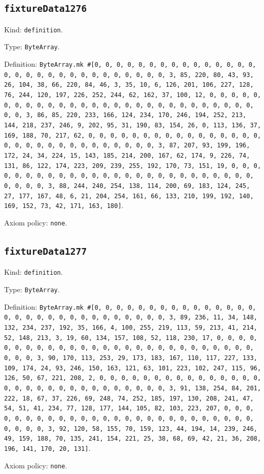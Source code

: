 \documentclass[11pt]{article}
\begin{document}
\subsection*{\texttt{fixtureData1276}}
\noindent Kind: \texttt{definition}.\par
\noindent Type: \texttt{ByteArray}.\par
\noindent Definition: \texttt{ByteArray.mk \#[0, 0, 0, 0, 0, 0, 0, 0, 0, 0, 0, 0, 0, 0, 0, 0, 0, 0, 0, 0, 0, 0, 0, 0, 0, 0, 0, 0, 0, 0, 3, 85, 220, 80, 43, 93, 26, 104, 38, 66, 220, 84, 46, 3, 35, 10, 6, 126, 201, 106, 227, 128, 76, 244, 120, 197, 226, 252, 244, 62, 162, 37, 100, 12, 0, 0, 0, 0, 0, 0, 0, 0, 0, 0, 0, 0, 0, 0, 0, 0, 0, 0, 0, 0, 0, 0, 0, 0, 0, 0, 0, 0, 0, 0, 3, 86, 85, 220, 233, 166, 124, 234, 170, 246, 194, 252, 213, 144, 218, 237, 246, 9, 202, 95, 31, 190, 83, 154, 26, 0, 113, 136, 37, 169, 188, 70, 217, 62, 0, 0, 0, 0, 0, 0, 0, 0, 0, 0, 0, 0, 0, 0, 0, 0, 0, 0, 0, 0, 0, 0, 0, 0, 0, 0, 0, 0, 0, 0, 3, 87, 207, 93, 199, 196, 172, 24, 34, 224, 15, 143, 185, 214, 200, 167, 62, 174, 9, 226, 74, 131, 86, 122, 174, 223, 209, 239, 255, 192, 170, 73, 151, 19, 0, 0, 0, 0, 0, 0, 0, 0, 0, 0, 0, 0, 0, 0, 0, 0, 0, 0, 0, 0, 0, 0, 0, 0, 0, 0, 0, 0, 0, 0, 3, 88, 244, 240, 254, 138, 114, 200, 69, 183, 124, 245, 27, 177, 167, 48, 6, 21, 204, 254, 161, 66, 133, 210, 199, 192, 140, 169, 152, 73, 42, 171, 163, 180]}.\par
\noindent Axiom policy: \texttt{none}.\par
\subsection*{\texttt{fixtureData1277}}
\noindent Kind: \texttt{definition}.\par
\noindent Type: \texttt{ByteArray}.\par
\noindent Definition: \texttt{ByteArray.mk \#[0, 0, 0, 0, 0, 0, 0, 0, 0, 0, 0, 0, 0, 0, 0, 0, 0, 0, 0, 0, 0, 0, 0, 0, 0, 0, 0, 0, 0, 0, 3, 89, 236, 11, 34, 148, 132, 234, 237, 192, 35, 166, 4, 100, 255, 219, 113, 59, 213, 41, 214, 52, 148, 213, 3, 19, 60, 134, 157, 108, 52, 118, 230, 17, 0, 0, 0, 0, 0, 0, 0, 0, 0, 0, 0, 0, 0, 0, 0, 0, 0, 0, 0, 0, 0, 0, 0, 0, 0, 0, 0, 0, 0, 0, 3, 90, 170, 113, 253, 29, 173, 183, 167, 110, 117, 227, 133, 109, 174, 24, 93, 246, 150, 163, 121, 63, 101, 223, 102, 247, 115, 96, 126, 50, 67, 221, 208, 2, 0, 0, 0, 0, 0, 0, 0, 0, 0, 0, 0, 0, 0, 0, 0, 0, 0, 0, 0, 0, 0, 0, 0, 0, 0, 0, 0, 0, 0, 0, 3, 91, 138, 254, 84, 201, 222, 18, 67, 37, 226, 69, 248, 74, 252, 185, 197, 130, 208, 241, 47, 54, 51, 41, 234, 77, 128, 177, 144, 105, 82, 103, 223, 207, 0, 0, 0, 0, 0, 0, 0, 0, 0, 0, 0, 0, 0, 0, 0, 0, 0, 0, 0, 0, 0, 0, 0, 0, 0, 0, 0, 0, 0, 0, 3, 92, 120, 58, 155, 70, 159, 123, 44, 194, 14, 239, 246, 49, 159, 188, 70, 135, 241, 154, 221, 25, 38, 68, 69, 42, 21, 36, 208, 196, 141, 170, 20, 131]}.\par
\noindent Axiom policy: \texttt{none}.\par
\end{document}
